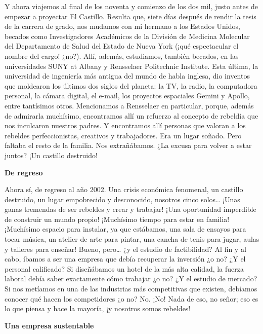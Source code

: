 Y ahora viajemos al final de los noventa y comienzo de los dos mil,
justo antes de empezar a proyectar El Castillo. Resulta que, siete días
después de rendir la tesis de la carrera de grado, nos mudamos con mi
hermano a los Estados Unidos, becados como Investigadores Académicos de
la División de Medicina Molecular del Departamento de Salud del Estado
de Nueva York (¡qué espectacular el nombre del cargo! ¿no?). Allí,
además, estudiamos, también becados, en las universidades SUNY at Albany
y Rensselaer Politechnic Institute. Esta última, la universidad de
ingeniería más antigua del mundo de habla inglesa, dio inventos que
moldearon los últimos dos siglos del planeta: la TV, la radio, la
computadora personal, la cámara digital, el e-mail, los proyectos
espaciales Gemini y Apollo, entre tantísimos otros. Mencionamos a
Rensselaer en particular, porque, además de admirarla muchísimo,
encontramos allí un refuerzo al concepto de rebeldía que nos inculcaron
nuestros padres. Y encontramos allí personas que valoran a los rebeldes
perfeccionistas, creativos y trabajadores. Era un lugar soñado. Pero
faltaba el resto de la familia. Nos extrañábamos. ¿La excusa para volver
a estar juntos? ¡Un castillo destruido!

\textbf{De regreso}

Ahora sí, de regreso al año 2002. Una crisis económica fenomenal, un
castillo destruido, un lugar empobrecido y desconocido, nosotros cinco
solos\ldots{} ¡Unas ganas tremendas de ser rebeldes y crear y trabajar!
¡Una oportunidad imperdible de construir un mundo propio! ¡Muchísimo
tiempo para estar en familia! ¡Muchísimo espacio para instalar, ya que
estábamos, una sala de ensayos para tocar música, un atelier de arte
para pintar, una cancha de tenis para jugar, aulas y talleres para
enseñar! Bueno, pero\ldots{} ¿y el estudio de factibilidad? Al fin y al
cabo, íbamos a ser una empresa que debía recuperar la inversión ¿o no?
¿Y el personal calificado? Si diseñábamos un hotel de la más alta
calidad, la fuerza laboral debía saber exactamente cómo trabajar ¿o no?
¿Y el estudio de mercado? Si nos metíamos en una de las industrias más
competitivas que existen, debíamos conocer qué hacen los competidores ¿o
no? No. ¡No! Nada de eso, no señor; eso es lo que piensa y hace la
mayoría, ¡y nosotros somos rebeldes!

\textbf{Una empresa sustentable}

